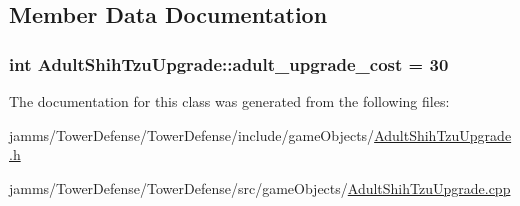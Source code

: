 \subsection{Member Data Documentation}
\hypertarget{class_adult_shih_tzu_upgrade_ac49306d745e7d9e33d8351a7c344a796}{
\subsubsection[{adult\+\_\+upgrade\+\_\+cost}]{\setlength{\rightskip}{0pt plus 5cm}int Adult\+Shih\+Tzu\+Upgrade\+::adult\+\_\+upgrade\+\_\+cost = 30\hspace{0.3cm}{\ttfamily [static]}}}\label{class_adult_shih_tzu_upgrade_ac49306d745e7d9e33d8351a7c344a796}


The documentation for this class was generated from the following files\+:\begin{DoxyCompactItemize}
\item 
jamms/\+Tower\+Defense/\+Tower\+Defense/include/game\+Objects/\hyperlink{_adult_shih_tzu_upgrade_8h}{Adult\+Shih\+Tzu\+Upgrade.\+h}\item 
jamms/\+Tower\+Defense/\+Tower\+Defense/src/game\+Objects/\hyperlink{_adult_shih_tzu_upgrade_8cpp}{Adult\+Shih\+Tzu\+Upgrade.\+cpp}\end{DoxyCompactItemize}
